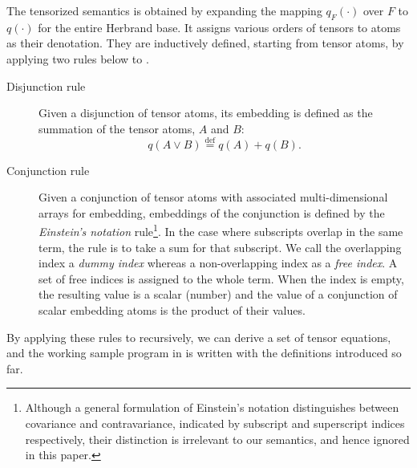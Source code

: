 \documentclass[a4paper]{report}
\newcommand{\defeq}{\ensuremath{\stackrel{\mathrm{def}}{=}}}
\newcommand{\indexfunc}{T}
\begin{document}
The  tensorized  semantics  is   obtained  by  expanding  the  mapping
$q_F(\cdot)$ over $F$  to $q(\cdot)$ for the entire  Herbrand base. It
assigns various orders  of tensors to atoms as  their denotation. They
are inductively defined,  starting from tensor atoms,  by applying two
rules below to .
\begin{description}
	\item [Disjunction rule]
	Given a disjunction of tensor atoms, its embedding
	is defined as the summation of the tensor atoms, $A$ and $B$:
	\[q(A \vee B) \defeq q(A)+ q(B).\]
	\item [Conjunction rule]
	Given a conjunction of tensor atoms with associated multi-dimensional
	arrays for embedding, embeddings of the conjunction is defined by the
	{\em Einstein's notation\/} rule\footnote{
		Although a general formulation of Einstein's notation distinguishes
		between covariance and contravariance, indicated by subscript and
		superscript indices respectively, their distinction is irrelevant to
		our semantics, and hence ignored in this paper.
	}.  In the case where subscripts overlap in the same term, the rule is
	to take a sum for that subscript. We call the overlapping index a {\em
		dummy  index\/}  whereas  a  non-overlapping  index  as  a  {\em  free
		index\/}. A  set of free indices  is assigned to the  whole term. When
	the index is  empty, the resulting value is a  scalar (number) and the
	value of  a conjunction of  scalar embedding  atoms is the  product of
	their values.
	
\end{description}
%
By applying  these rules  to   recursively, we
can derive a  set of tensor equations, and the  working sample program
in  is written with the definitions introduced
so far.
\end{document}
